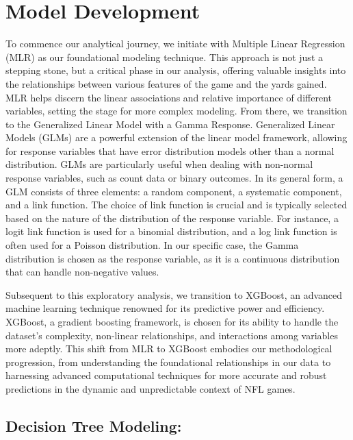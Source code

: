 \documentclass[
  super,
  preprint,
  3p]{elsarticle}
\begin{document}
\hypertarget{model-development}{%
\section{Model Development}\label{model-development}}

To commence our analytical journey, we initiate with Multiple Linear
Regression (MLR) as our foundational modeling technique. This approach
is not just a stepping stone, but a critical phase in our analysis,
offering valuable insights into the relationships between various
features of the game and the yards gained. MLR helps discern the linear
associations and relative importance of different variables, setting the
stage for more complex modeling. From there, we transition to the
Generalized Linear Model with a Gamma Response. Generalized Linear
Models (GLMs) are a powerful extension of the linear model framework,
allowing for response variables that have error distribution models
other than a normal distribution. GLMs are particularly useful when
dealing with non-normal response variables, such as count data or binary
outcomes. In its general form, a GLM consists of three elements: a
random component, a systematic component, and a link function. The
choice of link function is crucial and is typically selected based on
the nature of the distribution of the response variable. For instance, a
logit link function is used for a binomial distribution, and a log link
function is often used for a Poisson distribution. In our specific case,
the Gamma distribution is chosen as the response variable, as it is a
continuous distribution that can handle non-negative values.

Subsequent to this exploratory analysis, we transition to XGBoost, an
advanced machine learning technique renowned for its predictive power
and efficiency. XGBoost, a gradient boosting framework, is chosen for
its ability to handle the dataset's complexity, non-linear
relationships, and interactions among variables more adeptly. This shift
from MLR to XGBoost embodies our methodological progression, from
understanding the foundational relationships in our data to harnessing
advanced computational techniques for more accurate and robust
predictions in the dynamic and unpredictable context of NFL games.

\hypertarget{decision-tree-modeling}{%
\subsection{Decision Tree Modeling:}\label{decision-tree-modeling}}
\end{document}
